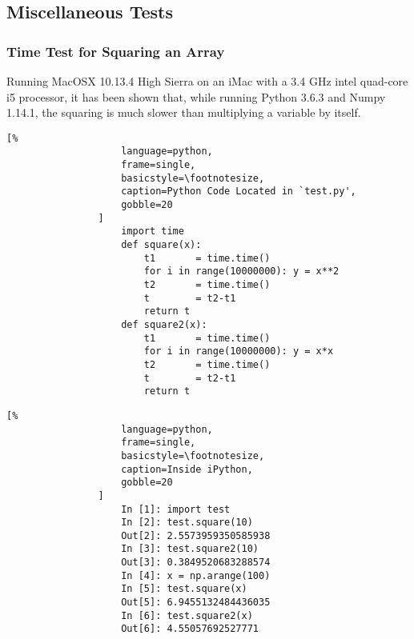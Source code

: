 \documentclass[crop=false,class=article,oneside]{standalone}
\begin{document}
    \subsection{Miscellaneous Tests}
        \subsubsection{Time Test for Squaring an Array}
            Running MacOSX 10.13.4 High Sierra on an iMac with a 3.4
            GHz intel quad-core i5 processor, it has been shown that,
            while running Python 3.6.3 and Numpy 1.14.1, the squaring
            is much slower than multiplying a variable by
            itself.\newline
            \begin{minipage}[t]{.48\textwidth}
                \centering
                \begin{lstlisting}[%
                    language=python,
                    frame=single,
                    basicstyle=\footnotesize,
                    caption=Python Code Located in `test.py',
                    gobble=20
                ]
                    import time
                    def square(x):
                        t1       = time.time()
                        for i in range(10000000): y = x**2
                        t2       = time.time()
                        t        = t2-t1
                        return t
                    def square2(x):
                        t1       = time.time()
                        for i in range(10000000): y = x*x
                        t2       = time.time()
                        t        = t2-t1
                        return t
                \end{lstlisting}
            \end{minipage}\hfill
            \begin{minipage}[t]{.48\textwidth}
                \centering
                \begin{lstlisting}[%
                    language=python,
                    frame=single,
                    basicstyle=\footnotesize,
                    caption=Inside iPython,
                    gobble=20
                ]
                    In [1]: import test
                    In [2]: test.square(10)
                    Out[2]: 2.5573959350585938
                    In [3]: test.square2(10)
                    Out[3]: 0.3849520683288574
                    In [4]: x = np.arange(100)
                    In [5]: test.square(x)
                    Out[5]: 6.9455132484436035
                    In [6]: test.square2(x)
                    Out[6]: 4.55057692527771
                \end{lstlisting}
            \end{minipage}\newline
\end{document}
